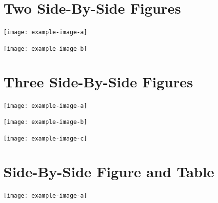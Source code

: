 \documentclass[letter]{amsart}
\begin{document}
\section*{Two Side-By-Side Figures}
\begin{minipage}[H]{0.5\textwidth}
    \centering
    \texttt{[image: example-image-a]}
\end{minipage}
\begin{minipage}[H]{0.5\textwidth}
    \centering
    \texttt{[image: example-image-b]}
\end{minipage}
\newpage

\section*{Three Side-By-Side Figures}
\begin{minipage}[H]{0.33\textwidth}
    \centering
    \texttt{[image: example-image-a]}
\end{minipage}
\begin{minipage}[H]{0.33\textwidth}
    \centering
    \texttt{[image: example-image-b]}
\end{minipage}
\begin{minipage}[H]{0.33\textwidth}
    \centering
    \texttt{[image: example-image-c]}
\end{minipage}
\newpage

\section*{Side-By-Side Figure and Table}
\begin{minipage}[H]{0.5\textwidth}
    \centering
    \texttt{[image: example-image-a]}
\end{minipage}
\begin{minipage}[H]{0.5\textwidth}
\end{minipage}
\newpage
\end{document}
